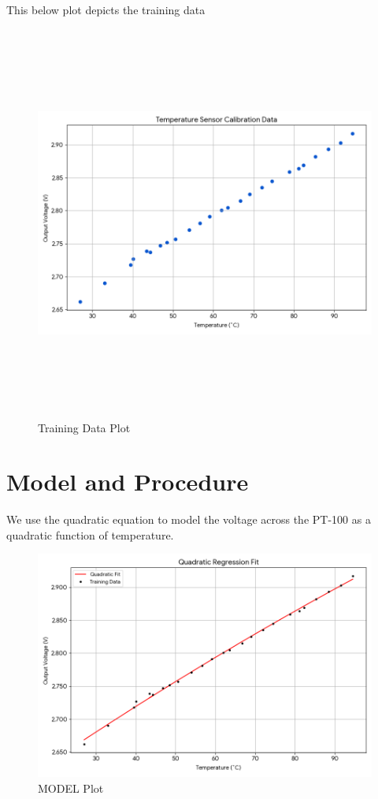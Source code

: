 \documentclass{article}
\begin{document}
\vspace{1cm}

This below plot depicts the training data

\vspace{1cm}

\begin{figure}[H]
    \centering
    \includegraphics[width=1\textwidth,height=13cm]{figs/training.png}
    \caption{Training Data Plot}
    \label{fig:circuit}
\end{figure}



\section*{Model and Procedure}

We use the quadratic equation to model the voltage across the PT-100 as a quadratic function of temperature.

\begin{figure}[H]
    \centering
    \includegraphics[width=1\textwidth]{figs/model.png}
    \caption{MODEL Plot}
    \label{fig:circuit}
\end{figure}
\end{document}
